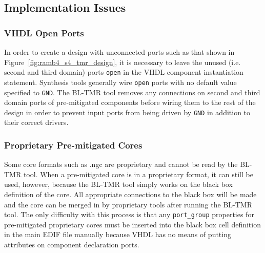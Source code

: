 \subsection{Implementation Issues}
\subsubsection{VHDL Open Ports}
In order to create a design with unconnected ports such as that shown in
Figure~\ref{fig:ramb4_s4_tmr_design}, it is necessary to leave the unused
(i.e. second and third domain) ports \texttt{open} in the VHDL component
instantiation statement. Synthesis tools generally wire \texttt{open} ports
with no default value specified to \texttt{GND}. The BL-TMR tool removes any
connections on second and third domain ports of pre-mitigated components before
wiring them to the rest of the design in order to prevent input ports from
being driven by \texttt{GND} in addition to their correct drivers.

\subsubsection{Proprietary Pre-mitigated Cores}
Some core formats such as .ngc are proprietary and cannot be read by the BL-TMR
tool. When a pre-mitigated core is in a proprietary format, it can still be
used, however, because the BL-TMR tool simply works on the black box definition
of the core. All appropriate connections to the black box will be made and the
core can be merged in by proprietary tools after running the BL-TMR tool. The
only difficulty with this process is that any \texttt{port\_group} properties for
pre-mitigated proprietary cores must be inserted into the black box cell
definition in the main EDIF file manually because VHDL has no means of putting
attributes on component declaration ports.
